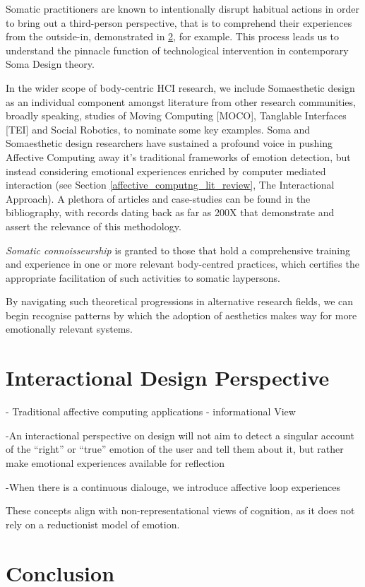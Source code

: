 Somatic practitioners are known to intentionally disrupt habitual actions in order to bring out a third-person perspective, that is to comprehend their experiences from the outside-in, demonstrated in \ref{}, for example. This process leads us to understand the pinnacle function of technological intervention in contemporary Soma Design theory.

In the wider scope of body-centric HCI research, we include Somaesthetic design as an individual component amongst literature from other research communities, broadly speaking, studies of Moving Computing [MOCO], Tanglable Interfaces [TEI] and Social Robotics, to nominate some key examples. Soma and Somaesthetic design researchers have sustained a profound voice in pushing Affective Computing away it's traditional frameworks of emotion detection, but instead considering emotional experiences enriched by computer mediated interaction (see Section \ref{affective_computng_lit_review}, The Interactional Approach). A plethora of articles and case-studies can be found in the bibliography, with records dating back as far as 200X that demonstrate and assert the relevance of this methodology.

\textit{Somatic connoisseurship} is granted to those that hold a comprehensive training and experience in one or more relevant body-centred practices, which certifies the appropriate facilitation of such activities to somatic laypersons. 

By navigating such theoretical progressions in alternative research fields, we can begin recognise patterns by which the adoption of aesthetics makes way for more emotionally relevant systems.

\section{Interactional Design Perspective}

- Traditional affective computing applications - informational View

-An  interactional  perspective  on  design  will  not aim to detect a singular account of the “right” or “true” emotion  of  the  user  and  tell  them  about  it,  but  rather  make  emotional  experiences  available  for  reflection

-When there is a continuous dialouge, we introduce affective loop experiences

These concepts align with non-representational views of cognition, as it does not rely on a reductionist model of emotion.  

\section{Conclusion}




